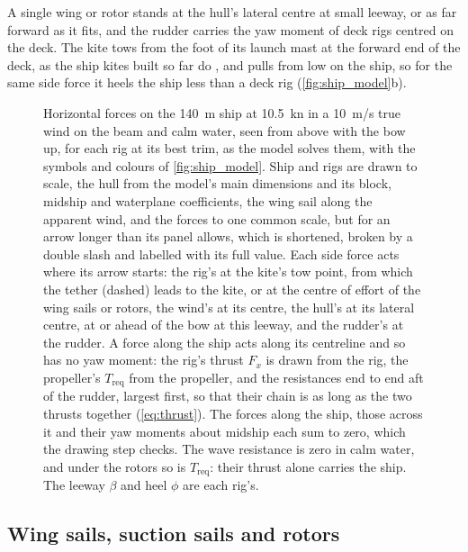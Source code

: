 A single wing or rotor stands at the hull's lateral centre at small leeway, or as far forward as it fits, and the rudder carries the yaw moment of deck rigs centred on the deck. The kite tows from the foot of its launch mast at the forward end of the deck, as the ship kites built so far do \citep{fritz2013}, and pulls from low on the ship, so for the same side force it heels the ship less than a deck rig (\cref{fig:ship_model}b).

\begin{figure}[tbp]
\centering
{}
\caption{Horizontal forces on the \SI{140}{m} ship at \SI{10.5}{kn} in a \SI{10}{m/s} true wind on the beam and calm water, seen from above with the bow up, for each rig at its best trim, as the model solves them, with the symbols and colours of \cref{fig:ship_model}. Ship and rigs are drawn to scale, the hull from the model's main dimensions and its block, midship and waterplane coefficients, the wing sail along the apparent wind, and the forces to one common scale, but for an arrow longer than its panel allows, which is shortened, broken by a double slash and labelled with its full value. Each side force acts where its arrow starts: the rig's at the kite's tow point, from which the tether (dashed) leads to the kite, or at the centre of effort of the wing sails or rotors, the wind's at its centre, the hull's at its lateral centre, at or ahead of the bow at this leeway, and the rudder's at the rudder. A force along the ship acts along its centreline and so has no yaw moment: the rig's thrust $F_x$ is drawn from the rig, the propeller's $T_\mathrm{req}$ from the propeller, and the resistances end to end aft of the rudder, largest first, so that their chain is as long as the two thrusts together (\cref{eq:thrust}). The forces along the ship, those across it and their yaw moments about midship each sum to zero, which the drawing step checks. The wave resistance is zero in calm water, and under the rotors so is $T_\mathrm{req}$: their thrust alone carries the ship. The leeway $\beta$ and heel $\phi$ are each rig's.}
\label{fig:force_balance}
\end{figure}

\subsection{Wing sails, suction sails and rotors}
\label{sec:deck_rigs}

